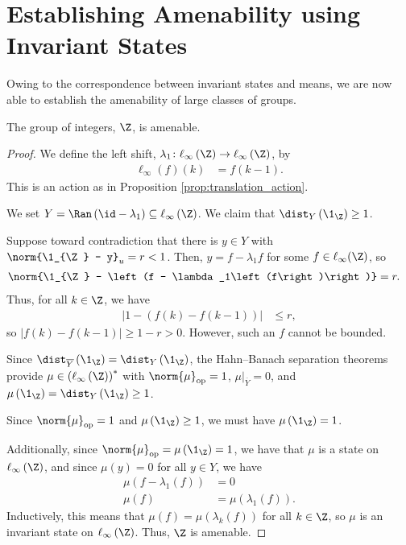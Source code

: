 \section{Establishing Amenability using Invariant States}%
Owing to the correspondence between invariant states and means, we are now able to establish the amenability of large classes of groups.
\begin{proposition}
  The group of integers, $\Z$, is amenable.
\end{proposition}
\begin{proof}
  We define the left shift, $\lambda_1\colon \ell_{\infty}\left(\Z\right) \rightarrow \ell_{\infty}\left(\Z\right)$, by
  \begin{align*}
    \ell_{\infty}\left(f\right)\left(k\right) &= f\left(k-1\right).
  \end{align*}
  This is an action as in Proposition \ref{prop:translation_action}. \newline

  We set $Y = \Ran\left(\id - \lambda_1\right)\subseteq \ell_{\infty}\left(\Z\right)$. We claim that $\dist_{Y}\left(\1_{\Z}\right) \geq 1$.\newline

  Suppose toward contradiction that there is $y\in Y$ with $\norm{\1_{\Z} - y}_{u} = r < 1$. Then, $y = f - \lambda_1 f$ for some $f\in \ell_{\infty}(\Z)$, so
  \begin{align*}
    \norm{\1_{\Z} - \left(f - \lambda_1\left(f\right)\right)} &= r.
  \end{align*}
  Thus, for all $k\in\Z$, we have
  \begin{align*}
    \left\vert 1 - \left(f(k) - f(k-1)\right) \right\vert &\leq r,
  \end{align*}
  so $\left\vert f(k) - f\left(k-1\right) \right\vert \geq 1-r > 0$. However, such an $f$ cannot be bounded.\newline

  Since $\dist_{\overline{Y}}\left(\1_{\Z}\right) = \dist_{Y}\left(\1_{\Z}\right)$, the Hahn--Banach separation theorems provide $\mu\in \left(\ell_{\infty}\left(\Z\right)\right)^{\ast}$ with $\norm{\mu}_{\text{op}} = 1$, $\mu|_{\overline{Y}} = 0$, and $\mu\left(\1_{\Z}\right) = \dist_{Y}\left(\1_{\Z}\right) \geq 1$.\newline

  Since $\norm{\mu}_{\text{op}} = 1$ and $\mu\left(\1_{\Z}\right) \geq 1$, we must have $\mu\left(\1_{\Z}\right) = 1$.\newline

  Additionally, since $\norm{\mu}_{\text{op}} = \mu\left(\1_{\Z}\right) = 1$, we have that $\mu$ is a state on $\ell_{\infty}\left(\Z\right)$, and since $\mu\left(y\right) = 0$ for all $y\in Y$, we have
  \begin{align*}
    \mu\left(f - \lambda_1\left(f\right)\right) &= 0\\
    \mu\left(f\right) &= \mu\left(\lambda_1\left(f\right)\right).
  \end{align*}
  Inductively, this means that $\mu\left(f\right) = \mu\left(\lambda_k\left(f\right)\right)$ for all $k\in \Z$, so $\mu$ is an invariant state on $\ell_{\infty}\left(\Z\right)$. Thus, $\Z$ is amenable.
\end{proof}
